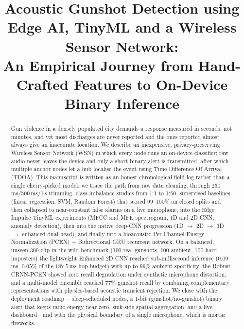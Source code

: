 \documentclass[conference]{IEEEtran}
\begin{document}
\title{Acoustic Gunshot Detection using Edge AI, TinyML and a Wireless Sensor Network:\\ An Empirical Journey from Hand-Crafted Features to On-Device Binary Inference}

\author{
}

\maketitle

\begin{abstract}
Gun violence in a densely populated city demands a response measured in seconds, not minutes, and yet most
discharges are never reported and the ones reported almost always give an inaccurate location. We describe
an inexpensive, privacy-preserving Wireless Sensor Network (WSN) in which every node runs an on-device
classifier; raw audio never leaves the device and only a short binary alert is transmitted, after which
multiple anchor nodes let a hub localise the event using Time Difference Of Arrival (TDOA). This manuscript
is written as an honest chronological field log rather than a single cherry-picked model: we trace the path
from raw data cleaning, through 250\,ms/500\,ms/1\,s trimming, class-imbalance studies from 1:1 to 1:50,
supervised baselines (linear regression, SVM, Random Forest) that scored 99--100\% on closed splits and then
collapsed to near-constant false alarms on a live microphone, into the Edge Impulse TinyML experiments (MFCC
and MFE spectrogram, 1D and 2D CNN, anomaly detection), then into the native deep-CNN progression
(1D $\rightarrow$ 2D $\rightarrow$ 3D $\rightarrow$ enhanced dual-head), and finally into a bioacoustic
Per-Channel Energy Normalization (PCEN) $+$ Bidirectional GRU recurrent network. On a balanced, unseen
300-clip in-the-wild benchmark (100 real gunshots, 100 ambient, 100 hard imposters) the lightweight Enhanced
2D CNN reached sub-millisecond inference ($0.09$\,ms, $0.05\%$ of the $187.5$\,ms hop budget) with up to
$99\%$ ambient specificity, the Robust CRNN-PCEN showed zero recall degradation under synthetic microphone
distortion, and a multi-model ensemble reached $77\%$ gunshot recall by combining complementary
representations with physics-based acoustic transient rejection. We close with the deployment roadmap---%
sleep-scheduled nodes, a 1-bit (gunshot/no-gunshot) binary alert that keeps radio energy near zero,
sink-side spatial aggregation, and a live dashboard---and with the physical boundary of a single microphone,
which is mortar fireworks.
\end{abstract}
\end{document}
